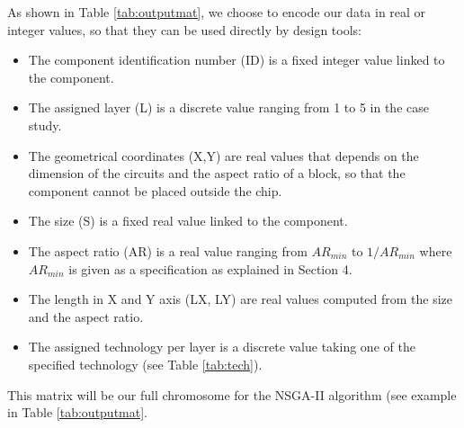 As shown in Table \ref{tab:outputmat}, we choose to encode our data in real or integer values, so that they can be used directly by design tools:
\begin{itemize}
\item The component identification number (ID) is a fixed integer value linked to the component.
\item The assigned layer (L) is a discrete value ranging from 1 to 5 in the case study.
\item The geometrical coordinates (X,Y) are real values that depends on the dimension of the circuits and the aspect ratio of a block, so that the component cannot be placed outside the chip.
\item The size (S) is a fixed real value linked to the component.
\item The aspect ratio (AR) is a real value ranging from $AR_{min}$ to $1/AR_{min}$ where $AR_{min}$ is given as a specification as explained in Section 4.
\item The length in X and Y axis (LX, LY) are real values computed from the size and the aspect ratio.
\item The assigned technology per layer is a discrete value taking one of the specified technology (see Table \ref{tab:tech}).
\end{itemize}
This matrix will be our full chromosome for the NSGA-II algorithm (see example in Table \ref{tab:outputmat}.


